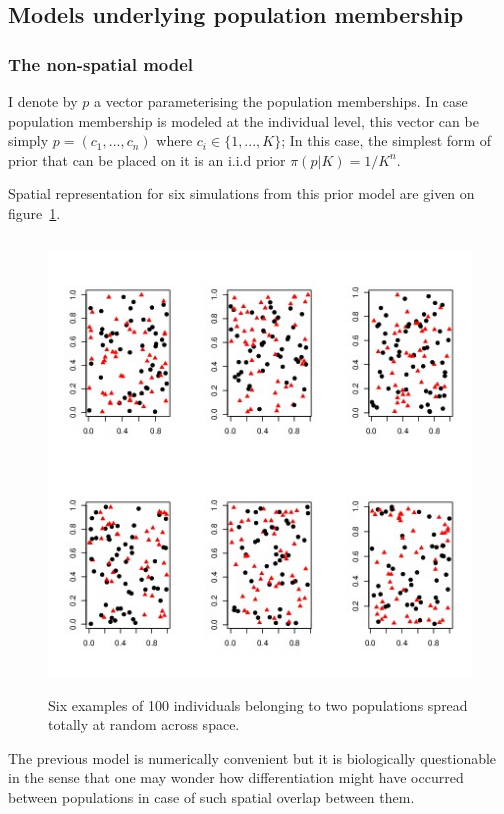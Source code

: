 \documentclass[a4paper,10pt]{article}
\begin{document}
\clearpage
\subsection{Models underlying population membership}\label{sec:mbrship}


\subsubsection{The non-spatial model}
I denote by  $p$ a vector parameterising the  population memberships. 
In case population membership is modeled at the individual level, this vector can be simply $p=(c_1,...,c_n)$ 
where $c_i \in \{1,...,K\}$; In this case, the simplest form of prior that can be placed on it is an i.i.d prior $\pi(p|K) = 1/K^n$. 

Spatial representation for six simulations from this prior model are given on figure~\ref{fig:nonspaprior}.

\begin{figure}[h]
\includegraphics[height=12cm,width=17cm]{./fig/example_spatial_bis.jpeg}
\caption{Six examples of 100 individuals belonging to two populations spread totally at random across space.}\label{fig:nonspaprior}
\end{figure}

The previous model is numerically convenient but it is biologically questionable in the sense that one may wonder how differentiation 
might have occurred between populations in case of such spatial overlap between them.
\end{document}
